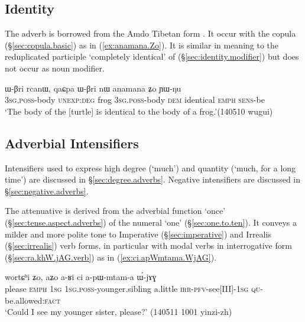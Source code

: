 \subsection{Identity} \label{sec:identity.adverbs}
The adverb  is borrowed from the Amdo Tibetan form . It occur with the copula  (§\ref{sec:copula.basic}) as in (\ref{ex:anamana.Zo}). It is similar in meaning to the reduplicated participle  `completely identical' of  (§\ref{sec:identity.modifier}) but does not occur as noun modifier. 

\begin{exe}
\ex \label{ex:anamana.Zo}
 \gll ɯ-βri rcanɯ, qaɕpa ɯ-βri nɯ anamana ʑo ɲɯ-ŋu \\
 \textsc{3sg}.\textsc{poss}-body \textsc{unexp}:\textsc{deg} frog  \textsc{3sg}.\textsc{poss}-body \textsc{dem} identical \textsc{emph} \textsc{sens}-be \\
\glt `The body of the [turtle] is identical to the body of a frog.'(140510 wugui)
\end{exe}

\subsection{Adverbial Intensifiers} \label{sec:intensifier.adverbs}
Intensifiers used to express high degree (`much') and quantity (`much, for a long time') are discussed in §\ref{sec:degree.adverbs}. Negative intensifiers are discussed in §\ref{sec:negative.adverbs}.

The attenuative  is derived from the adverbial function `once' (§\ref{sec:tense.aspect.adverbs}) of the numeral  `one' (§\ref{sec:one.to.ten}). It conveys a milder and more polite tone to Imperative (§\ref{sec:imperative}) and Irrealis (§\ref{sec:irrealis}) verb forms, in particular with modal verbs in interrogative form (§\ref{sec:ra.khW.jAG.verb}) as in (\ref{ex:ci.apWmtama.WjAG}).

 \begin{exe}
\ex \label{ex:ci.apWmtama.WjAG}
\gll wortɕʰi ʑo, aʑo a-ʁi ci a-pɯ-mtam-a ɯ́-jɤɣ \\
please \textsc{emph} \textsc{1sg} \textsc{1sg}.\textsc{poss}-younger.sibling a.little \textsc{irr}-\textsc{pfv}-see[III]-\textsc{1sg} \textsc{qu}-be.allowed:\textsc{fact} \\
\glt  `Could I see my younger sister, please?' (140511 1001 yinzi-zh)
 \end{exe} 
 
